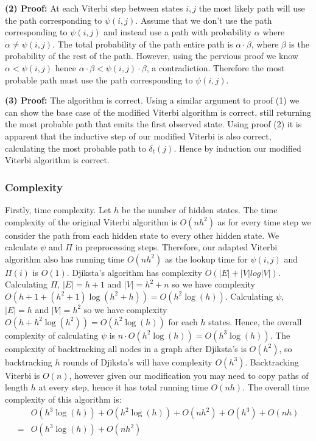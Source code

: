 \textbf{(2) Proof:} At each Viterbi step between states $i,j$ the most likely path will use the path corresponding to $\psi(i,j)$. Assume that we don't use the path corresponding to $\psi(i,j)$ and instead use a path with probability $\alpha$ where $\alpha \neq \psi(i,j)$. The total probability of the path entire path is $\alpha \cdot \beta$, where $\beta$ is the probability of the rest of the path. However, using the pervious proof we know $\alpha < \psi(i,j)$ hence $\alpha \cdot \beta < \psi(i,j) \cdot \beta$, a contradiction. Therefore the most probable path must use the path corresponding to $\psi(i,j)$. 

\textbf{(3) Proof:} The algorithm is correct. Using a similar argument to proof (1) we can show the base case of the modified Viterbi algorithm is correct, still returning the most probable path that emits the first observed state. Using proof (2) it is apparent that the inductive step of our modified Viterbi is also correct, calculating the most probable path to $\delta_t(j)$. Hence by induction our modified Viterbi algorithm is correct.  



\subsubsection*{Complexity}
Firstly, time complexity. Let $h$ be the number of hidden states. The time complexity of the original Viterbi algorithm is $O(nh^2)$ as for every time step we consider the path from each hidden state to every other hidden state. We calculate $\psi$ and $\Pi$ in preprocessing steps. Therefore, our adapted Viterbi algorithm also has running time $O(nh^2)$ as the lookup time for $\psi(i,j)$ and $\Pi(i)$ is $O(1)$. Djiksta's algorithm has complexity $O(|E|+|V|log|V|)$. Calculating $\Pi$, $|E| = h+1$ and $|V| = h^2 + n$ so we have complexity $O(h+1 + (h^2+1) \log(h^2+h)) = O(h^2 \log(h))$. Calculating $\psi$, $|E| = h$ and $|V| = h^2$ so we have complexity $O(h + h^2 \log(h^2)) = O(h^2 \log(h))$ for each $h$ states. Hence, the overall complexity of calculating $\psi$ is $n\cdot O(h^2 \log(h)) = O(h^3 \log(h))$. The complexity of backtracking all nodes in a graph after Djiksta's is $O(h^2)$, so backtracking $h$ rounds of Djiksta's will have complexity $O(h^3)$. Backtracking Viterbi is $O(n)$, however given our modification you may need to copy paths of length $h$ at every step, hence it has total running time $O(nh)$. The overall time complexity of this algorithm is:
\begin{align*}
&O(h^3 \log(h)) + O(h^2 \log(h)) + O(nh^2) + O(h^3) + O(nh)\\
=& O(h^3 \log(h)) + O(nh^2)
\end{align*}

